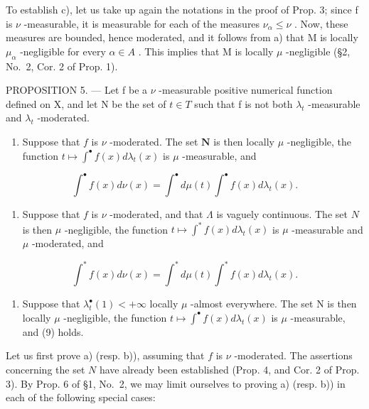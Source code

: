 To establish c), let us take up again the notations in the proof of Prop. 3; since f is \(\nu\) -measurable, it is measurable for each of the measures \(\nu_{\alpha} \leqslant \nu\) . Now, these measures are bounded, hence moderated, and it follows from a) that M is locally \(\mu_{\alpha}\) -negligible for every \(\alpha \in A\) . This implies that M is locally \(\mu\) -negligible (§2, No.~2, Cor. 2 of Prop. 1).

PROPOSITION 5. --- Let f be a \(\nu\) -measurable positive numerical function defined on X, and let N be the set of \(t \in T\) such that f is not both \(\lambda_{t}\) -measurable and \(\lambda_{t}\) -moderated.

\begin{enumerate}
\def\labelenumi{\alph{enumi})}
\tightlist
\item
  Suppose that \(f\) is \(\nu\) -moderated. The set \(\mathbf{N}\) is then locally \(\mu\) -negligible, the function \(t \mapsto \int^{\bullet} f(x) d\lambda_t(x)\) is \(\mu\) -measurable, and
\end{enumerate}

\[
\int^ {\bullet} f (x) d \nu (x) = \int^ {\bullet} d \mu (t) \int^ {\bullet} f (x) d \lambda_ {t} (x).\tag{9}
\]

\begin{enumerate}
\def\labelenumi{\alph{enumi})}
\setcounter{enumi}{1}
\tightlist
\item
  Suppose that \(f\) is \(\nu\) -moderated, and that \(\Lambda\) is vaguely continuous. The set \(N\) is then \(\mu\) -negligible, the function \(t \mapsto \int^{*} f(x) d\lambda_{t}(x)\) is \(\mu\) -measurable and \(\mu\) -moderated, and
\end{enumerate}

\[
\int^ {*} f (x) d \nu (x) = \int^ {*} d \mu (t) \int^ {*} f (x) d \lambda_ {t} (x).\tag{10}
\]

\begin{enumerate}
\def\labelenumi{\alph{enumi})}
\setcounter{enumi}{2}
\tightlist
\item
  Suppose that \(\lambda_t^\bullet(1) < +\infty\) locally \(\mu\) -almost everywhere. The set N is then locally \(\mu\) -negligible, the function \(t \mapsto \int^\bullet f(x) d\lambda_t(x)\) is \(\mu\) -measurable, and (9) holds.
\end{enumerate}

Let us first prove a) (resp. b)), assuming that \(f\) is \(\nu\) -moderated. The assertions concerning the set \(N\) have already been established (Prop. 4, and Cor. 2 of Prop. 3). By Prop. 6 of §1, No.~2, we may limit ourselves to proving a) (resp. b)) in each of the following special cases:

